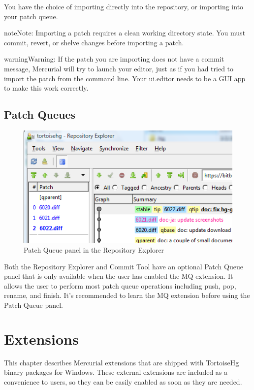 \documentclass[letterpaper,10pt,english]{manual}
\begin{document}
You have the choice of importing directly into the repository, or
importing into your patch queue.

\begin{notice}{note}{Note:}
Importing a patch requires a clean working directory state.  You
must commit, revert, or shelve changes before importing a patch.
\end{notice}

\begin{notice}{warning}{Warning:}
If the patch you are importing does not have a commit
message, Mercurial will try to launch your editor, just as if you
had tried to import the patch from the command line.  Your ui.editor
needs to be a GUI app to make this work correctly.
\end{notice}


\section{Patch Queues}
\begin{figure}[htbp]
\centering

\includegraphics{patchqueue.png}
\caption{Patch Queue panel in the Repository Explorer}\end{figure}

Both the Repository Explorer and Commit Tool have an optional Patch
Queue panel that is only available when the user has enabled the MQ
extension.  It allows the user to perform most patch queue operations
including push, pop, rename, and finish.  It's recommended to learn the
MQ extension before using the Patch Queue panel.

\resetcurrentobjects
\hypertarget{--doc-extensions}{}

\chapter{Extensions}
\hypertarget{module-extensions}{}
This chapter describes Mercurial extensions that are shipped with
TortoiseHg binary packages for Windows.  These external extensions are
included as a convenience to users, so they can be easily enabled as
soon as they are needed.
\end{document}

